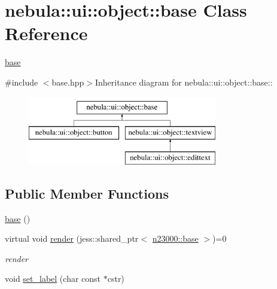 \hypertarget{classnebula_1_1ui_1_1object_1_1base}{
\section{nebula::ui::object::base Class Reference}
\label{classnebula_1_1ui_1_1object_1_1base}
}


\hyperlink{classnebula_1_1ui_1_1object_1_1base}{base}  


{\ttfamily \#include $<$base.hpp$>$}Inheritance diagram for nebula::ui::object::base::\begin{figure}[H]
\begin{center}
\leavevmode
\includegraphics[height=3cm]{classnebula_1_1ui_1_1object_1_1base}
\end{center}
\end{figure}
\subsection*{Public Member Functions}
\begin{DoxyCompactItemize}
\item 
\hyperlink{classnebula_1_1ui_1_1object_1_1base_abf16edd95689e30415423c775bc86724}{base} ()
\item 
virtual void \hyperlink{classnebula_1_1ui_1_1object_1_1base_a37483fa4e6e5f11a5e0262cf83d6f527}{render} (jess::shared\_\-ptr$<$ \hyperlink{classnebula_1_1platform_1_1renderer_1_1base}{n23000::base} $>$)=0
\begin{DoxyCompactList}\small\item\em render \item\end{DoxyCompactList}\item 
void \hyperlink{classnebula_1_1ui_1_1object_1_1base_a9b3115974df110ba5d5733d289f4e30f}{set\_\-label} (char const $\ast$cstr)
\end{DoxyCompactItemize}
